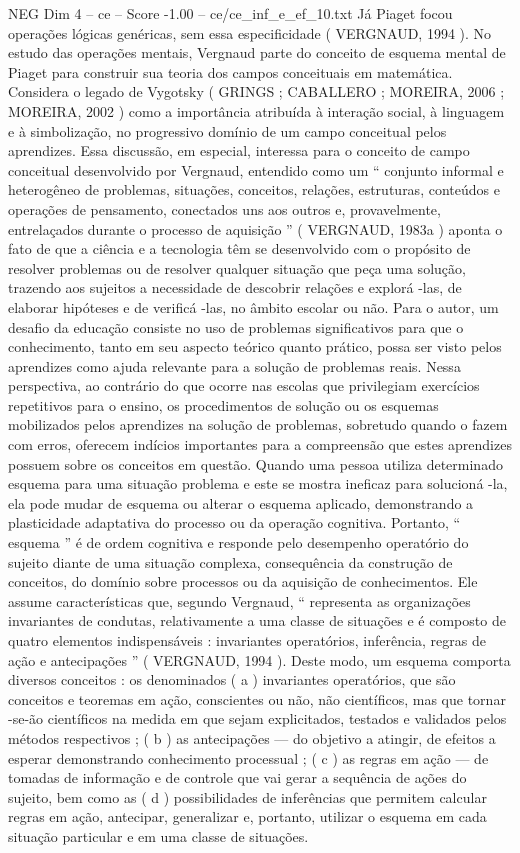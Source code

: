 \begin{textsample}{NEG Dim 4 – ce – Score -1.00 – ce/ce\_inf\_e\_ef\_10.txt}
Já Piaget focou operações lógicas genéricas, sem essa especificidade ( VERGNAUD, 1994 ).
No estudo das operações mentais, Vergnaud parte do conceito de esquema mental de Piaget para construir sua teoria dos campos conceituais em matemática.
Considera o legado de Vygotsky ( GRINGS ; CABALLERO ; MOREIRA, 2006 ; MOREIRA, 2002 ) como a importância atribuída à interação social, à linguagem e à simbolização, no progressivo domínio de um campo conceitual pelos aprendizes.
Essa discussão, em especial, interessa para o conceito de campo conceitual desenvolvido por Vergnaud, entendido como um “ conjunto informal e heterogêneo de problemas, situações, conceitos, relações, estruturas, conteúdos e operações de pensamento, conectados uns aos outros e, provavelmente, entrelaçados durante o processo de aquisição ” ( VERGNAUD, 1983a ) aponta o fato de que a ciência e a tecnologia têm se desenvolvido com o propósito de resolver problemas ou de resolver qualquer situação que peça uma solução, trazendo aos sujeitos a necessidade de descobrir relações e explorá -las, de elaborar hipóteses e de verificá -las, no âmbito escolar ou não.
Para o autor, um desafio da educação consiste no uso de problemas significativos para que o conhecimento, tanto em seu aspecto teórico quanto prático, possa ser visto pelos aprendizes como ajuda relevante para a solução de problemas reais.
Nessa perspectiva, ao contrário do que ocorre nas escolas que privilegiam exercícios repetitivos para o ensino, os procedimentos de solução ou os esquemas mobilizados pelos aprendizes na solução de problemas, sobretudo quando o fazem com erros, oferecem indícios importantes para a compreensão que estes aprendizes possuem sobre os conceitos em questão.
Quando uma pessoa utiliza determinado esquema para uma situação problema e este se mostra ineficaz para solucioná -la, ela pode mudar de esquema ou alterar o esquema aplicado, demonstrando a plasticidade adaptativa do processo ou da operação cognitiva.
Portanto, “ esquema ” é de ordem cognitiva e responde pelo desempenho operatório do sujeito diante de uma situação complexa, consequência da construção de conceitos, do domínio sobre processos ou da aquisição de conhecimentos.
Ele assume características que, segundo Vergnaud, “ representa as organizações invariantes de condutas, relativamente a uma classe de situações e é composto de quatro elementos indispensáveis : invariantes operatórios, inferência, regras de ação e antecipações ” ( VERGNAUD, 1994 ).
Deste modo, um esquema comporta diversos conceitos : os denominados ( a ) invariantes operatórios, que são conceitos e teoremas em ação, conscientes ou não, não científicos, mas que tornar -se-ão científicos na medida em que sejam explicitados, testados e validados pelos métodos respectivos ; ( b ) as antecipações — do objetivo a atingir, de efeitos a esperar demonstrando conhecimento processual ; ( c ) as regras em ação — de tomadas de informação e de controle que vai gerar a sequência de ações do sujeito, bem como as ( d ) possibilidades de inferências que permitem calcular regras em ação, antecipar, generalizar e, portanto, utilizar o esquema em cada situação particular e em uma classe de situações.

\end{textsample}
